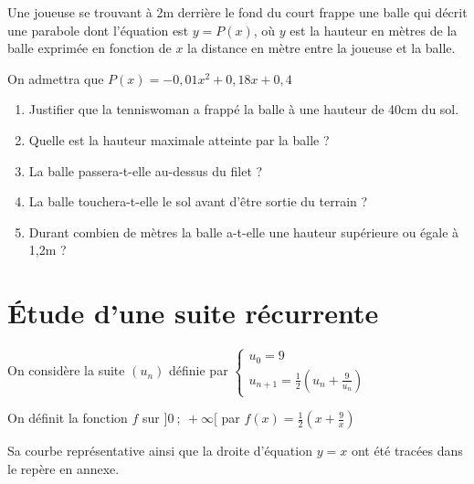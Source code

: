 \documentclass[oneside,12pt]{article}
\begin{document}
Une joueuse se trouvant à 2m derrière le fond du court frappe une balle qui décrit une parabole dont l'équation est $y=P(x)$, où $y$ est la hauteur en mètres de la balle exprimée en fonction de $x$ la distance en mètre entre la joueuse et la balle.

On admettra que $P(x)=-0,01x^2+0,18x+0,4$
\begin{enumerate}
	\item Justifier que la tenniswoman a frappé la balle à une hauteur de 40cm du sol.
	\item Quelle est la hauteur maximale atteinte par la balle ?
	\item La balle passera-t-elle au-dessus du filet ?
	\item La balle touchera-t-elle le sol avant d'être sortie du terrain ?
	\item Durant combien de mètres la balle a-t-elle une hauteur supérieure ou égale à 1,2m ?
\end{enumerate}




\newpage

\section{Étude d'une suite récurrente}
On considère la suite $(u_n)$ définie par $\begin{cases} u_0=9 \\ u_{n+1}=\frac{1}{2} \left( u_n + \frac{9}{u_n} \right)\end{cases}$

On définit la fonction $f$ sur $]0~;~+\infty[$ par $f(x)=\frac{1}{2}\left(x+\frac{9}{x}\right)$
	
Sa courbe représentative ainsi que la droite d'équation $y=x$ ont été tracées dans le repère en annexe.
\end{document}
